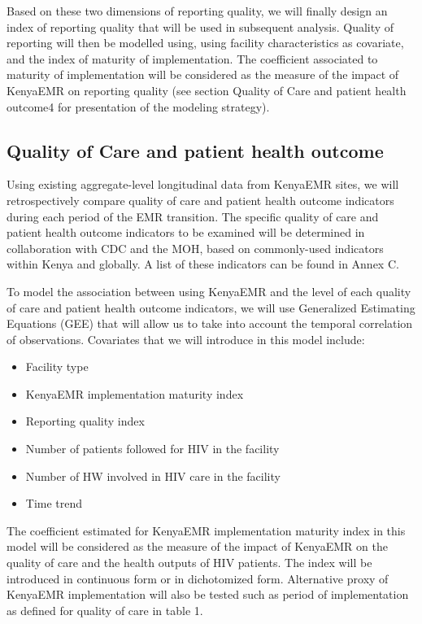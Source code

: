 \documentclass[a4paper,11pt,draft,twoside]{article}
\begin{document}
Based on these two dimensions of reporting quality, we will finally design an index of reporting quality that will be used in subsequent analysis. Quality of reporting will then be modelled using, using facility characteristics as covariate, and the index of maturity of implementation. The coefficient associated to maturity of implementation will be considered as the measure of the impact of KenyaEMR on reporting quality (see section Quality of Care and patient health outcome4 for presentation of the modeling strategy).

\subsection{Quality of Care and patient health outcome}
\label{sec:qual_of_care}

Using existing aggregate-level longitudinal data from KenyaEMR sites, we will retrospectively compare quality of care and patient health outcome indicators during each period of the EMR transition. The specific quality of care and patient health outcome indicators to be examined will be determined in collaboration with CDC and the MOH, based on commonly-used indicators within Kenya and globally. A list of these indicators can be found in Annex C.

To model the association between using KenyaEMR and the level of each quality of care and patient health outcome indicators, we will use Generalized Estimating Equations (GEE) that will allow us to take into account the temporal correlation of observations. Covariates that we will introduce in this model include:
\begin{itemize}
\item	Facility type
\item	KenyaEMR implementation maturity index
\item	Reporting quality index
\item	Number of patients followed for HIV in the facility
\item	Number of HW involved in HIV care in the facility
\item	Time trend
\end{itemize}
The coefficient estimated for KenyaEMR implementation maturity index in this model will be considered as the measure of the impact of KenyaEMR on the quality of care and the health outputs of HIV patients. The index will be introduced in continuous form or in dichotomized form. Alternative proxy of KenyaEMR implementation will also be tested such as period of implementation as defined for quality of care in table 1.
\end{document}
